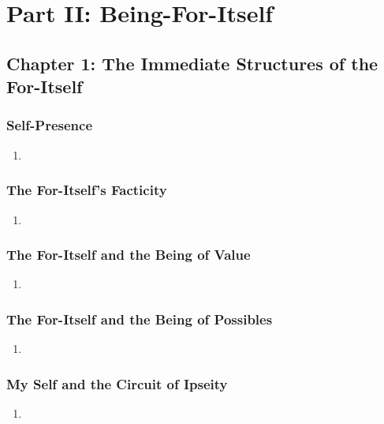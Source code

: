 \section{Part II: Being-For-Itself}

\subsection{Chapter 1: The Immediate Structures of the For-Itself}

\subsubsection{Self-Presence}

\begin{enumerate}
  \item
\end{enumerate}

\subsubsection{The For-Itself's Facticity}

\begin{enumerate}
  \item
\end{enumerate}

\subsubsection{The For-Itself and the Being of Value}

\begin{enumerate}
  \item
\end{enumerate}

\subsubsection{The For-Itself and the Being of Possibles}

\begin{enumerate}
  \item
\end{enumerate}

\subsubsection{My Self and the Circuit of Ipseity}

\begin{enumerate}
  \item
\end{enumerate}

